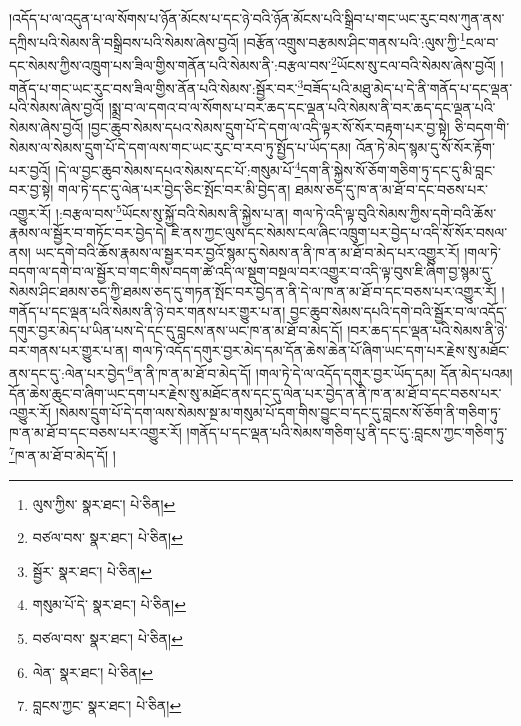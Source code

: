 །འདོད་པ་ལ་འདུན་པ་ལ་སོགས་པ་ཉོན་མོངས་པ་དང་ཉེ་བའི་ཉོན་མོངས་པའི་སྒྲིབ་པ་གང་ཡང་རུང་བས་ཀུན་ནས་དཀྲིས་པའི་སེམས་ནི་བསྒྲིབས་པའི་སེམས་ཞེས་བྱའོ། །བརྩོན་འགྲུས་བརྩམས་ཤིང་གནས་པའི་:ལུས་ཀྱི་\footnote{ལུས་ཀྱིས་  སྣར་ཐང་།  པེ་ཅིན། }ངལ་བ་དང་སེམས་ཀྱིས་འཁྲུག་པས་ཟིལ་གྱིས་གནོན་པའི་སེམས་ནི་:བརྩལ་བས་\footnote{བཙལ་བས་  སྣར་ཐང་།  པེ་ཅིན། }ཡོངས་སུ་ངལ་བའི་སེམས་ཞེས་བྱའོ། །གནོད་པ་གང་ཡང་རུང་བས་ཟིལ་གྱིས་ནོན་པའི་སེམས་:སྦྱོར་བར་\footnote{སྦྱོར་  སྣར་ཐང་།  པེ་ཅིན། }བཟོད་པའི་མཐུ་མེད་པ་དེ་ནི་གནོད་པ་དང་ལྡན་པའི་སེམས་ཞེས་བྱའོ། །སྨྲ་བ་ལ་དགའ་བ་ལ་སོགས་པ་བར་ཆད་དང་ལྡན་པའི་སེམས་ནི་བར་ཆད་དང་ལྡན་པའི་སེམས་ཞེས་བྱའོ། །བྱང་ཆུབ་སེམས་དཔའ་སེམས་དྲུག་པོ་དེ་དག་ལ་འདི་ལྟར་སོ་སོར་བརྟག་པར་བྱ་སྟེ། ཅི་བདག་གི་སེམས་ལ་སེམས་དྲུག་པོ་དེ་དག་ལས་གང་ཡང་རུང་བ་རབ་ཏུ་སྤྱོད་པ་ཡོད་དམ། འོན་ཏེ་མེད་སྙམ་དུ་སོ་སོར་རྟོག་པར་བྱའོ། །དེ་ལ་བྱང་ཆུབ་སེམས་དཔའ་སེམས་དང་པོ་:གསུམ་པོ་\footnote{གསུམ་པོ་དེ་  སྣར་ཐང་།  པེ་ཅིན། }དག་ནི་སྐྱེས་སོ་ཅོག་གཅིག་ཏུ་དང་དུ་མི་བླང་བར་བྱ་སྟེ། གལ་ཏེ་དང་དུ་ལེན་པར་བྱེད་ཅིང་སྤོང་བར་མི་བྱེད་ན། ཐམས་ཅད་དུ་ཁ་ན་མ་ཐོ་བ་དང་བཅས་པར་འགྱུར་རོ། །:བརྩལ་བས་\footnote{བཙལ་བས་  སྣར་ཐང་།  པེ་ཅིན། }ཡོངས་སུ་སྐྱོ་བའི་སེམས་ནི་སྐྱེས་པ་ན། གལ་ཏེ་འདི་ལྟ་བུའི་སེམས་ཀྱིས་དགེ་བའི་ཆོས་རྣམས་ལ་སྦྱོར་བ་གཏོང་བར་བྱེད་དེ། ཇི་ནས་ཀྱང་ལུས་དང་སེམས་ངལ་ཞིང་འཁྲུག་པར་བྱེད་པ་འདི་སོ་སོར་བསལ་ནས། ཡང་དགེ་བའི་ཆོས་རྣམས་ལ་སྦྱར་བར་བྱའོ་སྙམ་དུ་སེམས་ན་ནི་ཁ་ན་མ་ཐོ་བ་མེད་པར་འགྱུར་རོ། །གལ་ཏེ་བདག་ལ་དགེ་བ་ལ་སྦྱོར་བ་གང་གིས་བདག་ཚེ་འདི་ལ་སྡུག་བསྔལ་བར་འགྱུར་བ་འདི་ལྟ་བུས་ཇི་ཞིག་བྱ་སྙམ་དུ་སེམས་ཤིང་ཐམས་ཅད་ཀྱི་ཐམས་ཅད་དུ་གཏན་སྤོང་བར་བྱེད་ན་ནི་དེ་ལ་ཁ་ན་མ་ཐོ་བ་དང་བཅས་པར་འགྱུར་རོ། །གནོད་པ་དང་ལྡན་པའི་སེམས་ནི་ཉེ་བར་གནས་པར་གྱུར་པ་ན། བྱང་ཆུབ་སེམས་དཔའི་དགེ་བའི་སྦྱོར་བ་ལ་འདོད་དགུར་བྱར་མེད་པ་ཡིན་པས་དེ་དང་དུ་བླངས་ནས་ཡང་ཁ་ན་མ་ཐོ་བ་མེད་དོ། །བར་ཆད་དང་ལྡན་པའི་སེམས་ནི་ཉེ་བར་གནས་པར་གྱུར་པ་ན། གལ་ཏེ་འདོད་དགུར་བྱར་མེད་དམ་དོན་ཆེས་ཆེན་པོ་ཞིག་ཡང་དག་པར་རྗེས་སུ་མཐོང་ནས་དང་དུ་:ལེན་པར་བྱེད་\footnote{ལེན་  སྣར་ཐང་།  པེ་ཅིན། }ན་ནི་ཁ་ན་མ་ཐོ་བ་མེད་དོ། །གལ་ཏེ་དེ་ལ་འདོད་དགུར་བྱར་ཡོད་དམ། དོན་མེད་པའམ། དོན་ཆེས་ཆུང་བ་ཞིག་ཡང་དག་པར་རྗེས་སུ་མཐོང་ནས་དང་དུ་ལེན་པར་བྱེད་ན་ནི་ཁ་ན་མ་ཐོ་བ་དང་བཅས་པར་འགྱུར་རོ། །སེམས་དྲུག་པོ་དེ་དག་ལས་སེམས་སྔ་མ་གསུམ་པོ་དག་གིས་བྱུང་བ་དང་དུ་བླངས་སོ་ཅོག་ནི་གཅིག་ཏུ་ཁ་ན་མ་ཐོ་བ་དང་བཅས་པར་འགྱུར་རོ། །གནོད་པ་དང་ལྡན་པའི་སེམས་གཅིག་པུ་ནི་དང་དུ་:བླངས་ཀྱང་གཅིག་ཏུ་\footnote{བླངས་ཀྱང་  སྣར་ཐང་།  པེ་ཅིན། }ཁ་ན་མ་ཐོ་བ་མེད་དོ། །
